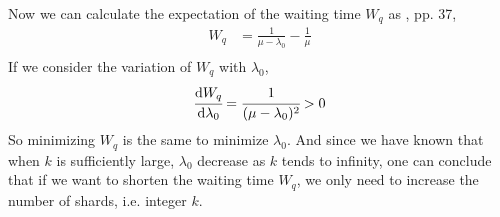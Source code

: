 Now we can calculate the expectation of the waiting time $W_q$ as \cite{bhat2008IntroductionQueueingTheory}, pp. 37,
\begin{align*}
    W_q &= \frac{1}{\mu - \lambda_0} - \frac{1}{\mu} \\ 
\end{align*}
If we consider the variation of $W_q$ with $\lambda_0$,
\begin{align*}
    \cfrac{\mathrm{d}W_q}{\mathrm{d}\lambda_0} = \cfrac{1}{(\mu - \lambda_0)^2} > 0
\end{align*}
So minimizing $W_q$ is the same to minimize $\lambda_0$. And since we have known that when $k$ is sufficiently large,
$\lambda_0$ decrease as $k$ tends to infinity, one can conclude that if we want to shorten the waiting time $W_q$, we only need to
increase the number of shards, i.e. integer $k$.
